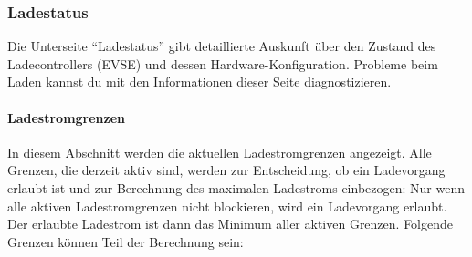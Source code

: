 \documentclass[a4paper,10pt]{article}
\begin{document}
\begin{multicols*}{2}
	\subsubsection{Ladestatus}\label{evse}
	Die Unterseite \enquote{Ladestatus} gibt detaillierte Auskunft über den Zustand
	des Ladecontrollers (EVSE) und dessen Hardware-Konfiguration. Probleme beim Laden
	kannst du mit den Informationen dieser Seite diagnostizieren.

	\paragraph{Ladestromgrenzen}
	In diesem Abschnitt werden die aktuellen Ladestromgrenzen angezeigt. Alle Grenzen, die
	derzeit aktiv sind, werden zur Entscheidung, ob ein Ladevorgang erlaubt ist und zur Berechnung des maximalen Ladestroms einbezogen:
	Nur wenn alle aktiven Ladestromgrenzen nicht blockieren, wird ein Ladevorgang erlaubt.
	Der erlaubte Ladestrom ist dann das Minimum aller aktiven Grenzen. Folgende Grenzen können Teil der Berechnung sein:


\end{multicols*}
\end{document}
